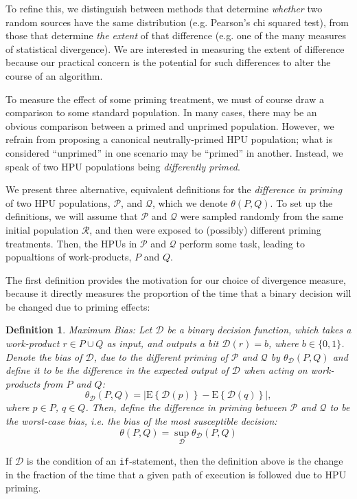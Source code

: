 \documentclass[12pt]{article}
\newtheorem{mydef}{Definition}
\begin{document}
To refine this, we distinguish between methods that determine \textit{whether}
two random sources have the same distribution 
(e.g. Pearson's chi squared test), from those that determine
\textit{the extent} of that difference (e.g. one of the many measures of 
statistical divergence).  We are interested in measuring the extent of
difference because our practical concern is the potential for such
differences to alter the course of an algorithm.

To measure the effect of some priming treatment, we must of course draw a 
comparison to some standard population.  In many cases, there may be an 
obvious comparison between a primed and unprimed population.  However, we 
refrain from proposing a canonical neutrally-primed HPU population; what is 
considered ``unprimed'' in one scenario may be ``primed'' in another. 
Instead, we speak of two HPU populations being \textit{differently primed}.

We present three alternative, equivalent definitions for the 
\textit{difference in priming} of two HPU populations, $\mathcal{P}$, and 
$\mathcal{Q}$, which we denote $\theta(P,Q)$.  To set up the definitions,
we will assume that $\mathcal{P}$ and $\mathcal{Q}$ 
were sampled randomly from the same initial population $\mathcal{R}$, and 
then were exposed to (possibly) different priming treatments. Then, the HPUs 
in $\mathcal{P}$ and $\mathcal{Q}$ perform some task, leading to popualtions 
of work-products, $P$ and $Q$.

The first definition provides the motivation for our choice of divergence
measure, because it directly measures the proportion of the time that a
binary decision will be changed due to priming effects:

\begin{mydef}
	\label{def:bias}
	{\upshape Maximum Bias:}
	Let $\mathcal{D}$ be a binary decision function, which takes a 
	work-product
	$r \in P \cup Q$ as input, and outputs a bit $\mathcal{D}(r)=b$, where 
	$b \in \{0,1\}$. Denote the \emph{bias} of $\mathcal{D}$, due to the
	different priming of $\mathcal{P}$ and $\mathcal{Q}$ by
	$\theta_\mathcal{D}(P,Q)$ and define it to be the difference 
	in the expected output of $\mathcal{D}$ when acting on work-products from 
	$P$ and $Q$:
	$$
	\theta_\mathcal{D}(P,Q) = 
		\left| 
			\mathrm{E}\left\{ \mathcal{D}(p) \right\} 
			- \mathrm{E}\left\{ \mathcal{D}(q) \right\} 
		\right|,
	$$
	where $p \in P$, $q \in Q$.  Then, define the difference in priming 
	between $\mathcal{P}$ and $\mathcal{Q}$ to be the worst-case bias, i.e. 
	the bias of the most susceptible decision:
	$$
	\theta(P,Q) = 
		\sup_\mathcal{D} \theta_\mathcal{D}(P,Q)
	$$
\end{mydef}
If $\mathcal{D}$ is the condition of an \texttt{if}-statement, then the 
definition above is the change in the fraction of the time that a given 
path of execution is followed due to HPU priming.
\end{document}
